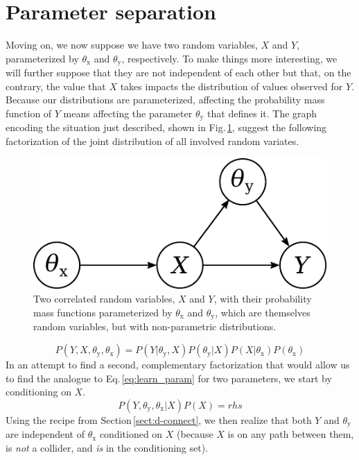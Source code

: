 \documentclass[]{report}
\begin{document}
\section{Parameter separation} \label{sect:param-sep}
Moving on, we now suppose we have two random variables, $X$ and $Y$, parameterized by $\theta_\mathrm{x}$ and $\theta_\mathrm{y}$, respectively. To make things more interesting, we will further suppose that they are not independent of each other but that, on the contrary, the value that $X$ takes impacts the distribution of values observed for $Y$. Because our distributions are parameterized, affecting the probability mass function of $Y$ means affecting the parameter $\theta_\mathrm{y}$ that defines it. The graph encoding the situation just described, shown in Fig.\,\ref{fig:2var2param}, suggest the following factorization of the joint distribution of all involved random variates.
\begin{figure}[h]
	\centering
	\includegraphics[scale=0.5]{2var_2param}
	\caption{Two correlated random variables, $X$ and $Y$, with their probability mass functions parameterized by $\theta_\mathrm{x}$ and $\theta_\mathrm{y}$, which are themselves random variables, but with non-parametric distributions.}
	\label{fig:2var2param}
\end{figure}
\begin{equation} \label{eq:2param_from_G}
P(Y, X, \theta_\mathrm{y}, \theta_\mathrm{x}) = P(Y|\theta_\mathrm{y}, X)P(\theta_\mathrm{y}|X)P(X|\theta_\mathrm{x})P(\theta_\mathrm{x})
\end{equation}
In an attempt to find a second, complementary factorization that would allow us to find the analogue to Eq.\,\ref{eq:learn_param} for two parameters, we start by conditioning on $X$.
\begin{equation}
P(Y, \theta_\mathrm{y}, \theta_\mathrm{x}|X)P(X) = rhs
\end{equation}
Using the recipe from Section\,\ref{sect:d-connect}, we then realize that both $Y$ and $\theta_\mathrm{y}$ are independent of $\theta_\mathrm{x}$ conditioned on $X$ (because $X$ is on any path between them, is \emph{not} a collider, and \emph{is} in the conditioning set).
\end{document}
